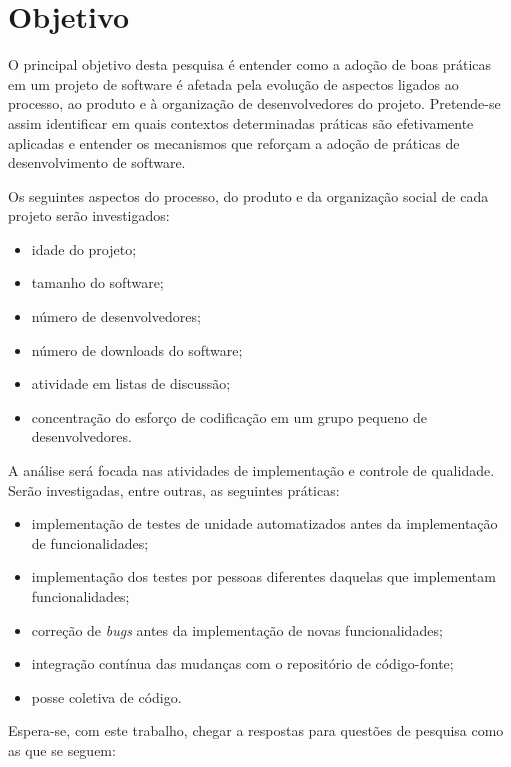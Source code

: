 \documentclass{article}
\begin{document}
\section{Objetivo}

O principal objetivo desta pesquisa é entender como a adoção de boas práticas
em um projeto de software é afetada pela evolução de aspectos ligados ao
processo, ao produto e à organização de desenvolvedores do projeto.
Pretende-se assim identificar em quais contextos determinadas práticas são
efetivamente aplicadas e entender os mecanismos que reforçam a adoção de
práticas de desenvolvimento de software.

Os seguintes aspectos do processo, do produto e da organização social de cada
projeto serão investigados:
\begin{itemize}
  \item idade do projeto;
  \item tamanho do software;
  \item número de desenvolvedores;
  \item número de downloads do software;
  \item atividade em listas de discussão;
  \item concentração do esforço de codificação em um grupo pequeno de
desenvolvedores.
\end{itemize}

A análise será focada nas atividades de implementação e controle de qualidade.
Serão investigadas, entre outras, as seguintes práticas:
\begin{itemize}
  \item implementação de testes de unidade automatizados antes da implementação
  de funcionalidades;
  \item implementação dos testes por pessoas diferentes daquelas que
  implementam funcionalidades;
  \item correção de \emph{bugs} antes da implementação de novas funcionalidades;
  \item integração contínua das mudanças com o repositório de código-fonte;
  \item posse coletiva de código.
\end{itemize}

Espera-se, com este trabalho, chegar a respostas para questões de pesquisa
como as que se seguem:
\end{document}
